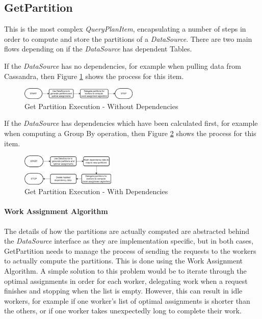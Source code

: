 \subsection{GetPartition}
This is the most complex \textit{QueryPlanItem}, encapsulating a number of steps in order to compute and store the partitions of a \textit{DataSource}. There are two main flows depending on if the \textit{DataSource} has dependent Tables.

If the \textit{DataSource} has no dependencies, for example when pulling data from Cassandra, then Figure \ref{fig:get-partition-no-dependencies} shows the process for this item. 

\begin{figure}[h]
	\centering
	\includegraphics[width=0.5\textwidth]{chapters/diagrams/implementation/get-partition-no-dependencies-flow}
	\caption{Get Partition Execution - Without Dependencies}
	\label{fig:get-partition-no-dependencies}
\end{figure}

If the \textit{DataSource} has dependencies which have been calculated first, for example when computing a Group By operation, then Figure \ref{fig:get-partition-dependencies} shows the process for this item. 

\begin{figure}[h]
	\centering
	\includegraphics[width=0.4\textwidth]{chapters/diagrams/implementation/get-partition-dependencies-flow}
	\caption{Get Partition Execution - With Dependencies}
	\label{fig:get-partition-dependencies}
\end{figure}

\paragraph{Work Assignment Algorithm}
The details of how the partitions are actually computed are abstracted behind the \textit{DataSource} interface as they are implementation specific, but in both cases, GetPartition needs to manage the process of sending the requests to the workers to actually compute the partitions. This is done using the Work Assignment Algorithm. A simple solution to this problem would be to iterate through the optimal assignments in order for each worker, delegating work when a request finishes and stopping when the list is empty. However, this can result in idle workers, for example if one worker's list of optimal assignments is shorter than the others, or if one worker takes unexpectedly long to complete their work.

